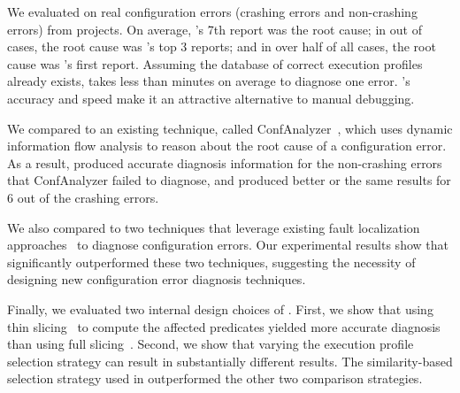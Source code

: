 We evaluated \ourtool on \errors real configuration errors
(\crash crashing errors and \noncrash non-crashing errors)
from \subjectnum projects.
On average, \ourtool's 7th report was the root cause; in
\topnum out of \errors cases, the root cause was \ourtool's
top 3 reports; and in over half of all
cases, the root cause was \ourtool's first report.
Assuming the database of correct execution profiles already exists,
\ourtool takes less than \avgtime minutes on average to diagnose
one error.  \ourtool's accuracy and speed make it an attractive alternative
to manual debugging.


We compared \ourtool to an existing technique, called ConfAnalyzer~\cite{Rabkin:2011:PPC},
which uses dynamic information flow analysis to reason about the root cause of a
configuration error. As a result, \ourtool produced accurate diagnosis information for the \noncrash
non-crashing errors that ConfAnalyzer failed to diagnose,
and produced better or the same results
for 6 out of the \crash crashing errors. 

We also compared \ourtool to two techniques that leverage existing fault localization
approaches~\cite{Jones:2002, McCamant:2003} to diagnose configuration errors. Our experimental results show
that \ourtool significantly outperformed these two techniques, suggesting
the necessity of designing new configuration error diagnosis techniques.%




Finally, we evaluated two internal design choices of \ourtool.
First, we show that using thin slicing~\cite{Sridharan:2007} to compute the affected
predicates yielded more accurate diagnosis than using full slicing~\cite{Horwitz:1988}.
Second, we %
show that varying the execution
profile selection strategy can result in substantially different
results. %
The similarity-based selection strategy used in \ourtool outperformed
the other two comparison strategies.


